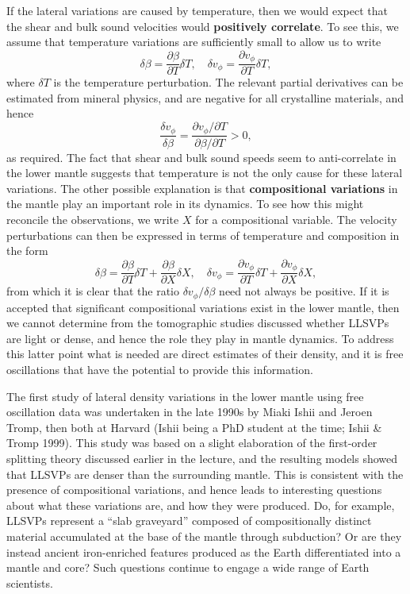If the lateral variations are caused by temperature, then we would expect that the shear and bulk sound velocities 
would \textbf{positively correlate}. To see this, we assume that temperature variations are sufficiently small to allow us to write
\begin{equation}\label{eq:31}
\delta\beta=\frac{\partial\beta}{\partial T}\delta T, \quad \delta v_{\phi} = \frac{\partial v_{\phi}}{\partial T}\delta T,
\end{equation}
where $\delta T$ is the temperature perturbation. The relevant partial derivatives can be estimated from mineral physics, and are 
negative for all crystalline materials, and hence
\begin{equation}\label{eq:32}
\frac{\delta v_{\phi}}{\delta\beta}=\frac{\partial v_{\phi}/\partial T}{\partial\beta/\partial T}>0,
\end{equation}
as required. The fact that shear and bulk sound speeds seem to anti-correlate in the lower mantle suggests that temperature is not 
the only cause for these lateral variations. The other possible explanation is that \textbf{compositional variations} in the mantle play an 
important role in its dynamics. To see how this might reconcile the observations, we write $X$ for a compositional variable. The 
velocity perturbations can then be expressed in terms of temperature and composition in the form
\begin{equation}\label{eq:33}
\delta\beta=\frac{\partial\beta}{\partial T}\delta T+\frac{\partial\beta}{\partial X}\delta X, \quad \delta v_{\phi}=
\frac{\partial v_{\phi}}{\partial T}\delta T+\frac{\partial v_{\phi}}{\partial X}\delta X,
\end{equation}
from which it is clear that the ratio $\delta v_{\phi}/\delta\beta$ need not always be positive. If it is accepted that 
significant compositional variations exist in the lower mantle, then we cannot determine from the tomographic studies discussed 
whether LLSVPs are light or dense, and hence the role they play in mantle dynamics. To address this latter point what 
is needed are direct estimates of their density, and it is free oscillations that have the potential to provide this information.

The first study of lateral density variations in the lower mantle using free oscillation data was undertaken in the late 1990s by 
Miaki Ishii and Jeroen Tromp, then both at Harvard (Ishii being a PhD student at the time; Ishii \& Tromp 1999). This study was based on a slight elaboration of the first-order splitting theory 
discussed earlier in the lecture, and the resulting models showed that LLSVPs are denser than the surrounding mantle. This is consistent 
with the presence of compositional variations, and hence leads to interesting questions about what these variations are, and how they were 
produced. Do, for example, LLSVPs represent a ``slab graveyard'' composed of compositionally distinct material accumulated at the base of 
the mantle through subduction? Or are they instead ancient iron-enriched features produced as the Earth differentiated into a mantle 
and core? Such questions continue to engage a wide range of Earth scientists.

